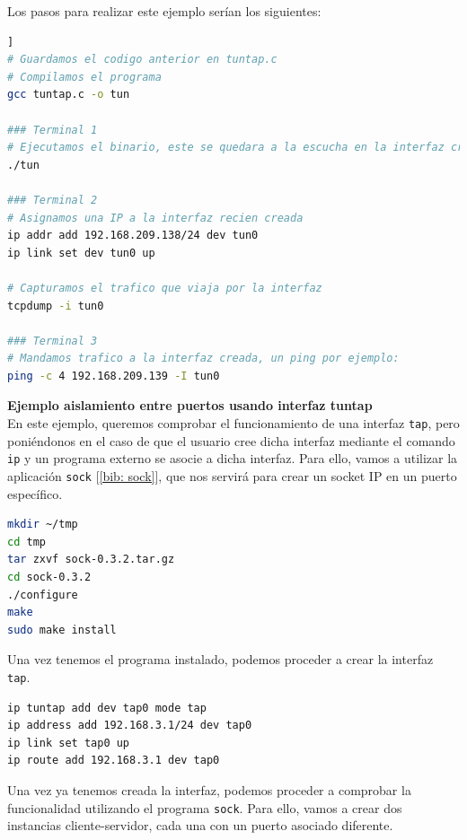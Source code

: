 \documentclass[12pt]{article}
\begin{document}
	\noindent Los pasos para realizar este ejemplo serían los siguientes:
	\begin{lstlisting}[language=Bash, label=lst: instr tuntap.c , caption=Instrucciones para realizar las pruebas con el código [\ref{lst:tuntap.c}]]
# Guardamos el codigo anterior en tuntap.c
# Compilamos el programa
gcc tuntap.c -o tun

### Terminal 1
# Ejecutamos el binario, este se quedara a la escucha en la interfaz creada
./tun

### Terminal 2
# Asignamos una IP a la interfaz recien creada
ip addr add 192.168.209.138/24 dev tun0
ip link set dev tun0 up

# Capturamos el trafico que viaja por la interfaz
tcpdump -i tun0

### Terminal 3
# Mandamos trafico a la interfaz creada, un ping por ejemplo:
ping -c 4 192.168.209.139 -I tun0
	\end{lstlisting}
	
	\pagebreak
	
	\noindent \textbf{\large Ejemplo aislamiento entre puertos usando interfaz tuntap}\\
	
	\noindent En este ejemplo, queremos comprobar el funcionamiento de una interfaz \texttt{tap}, pero poniéndonos en el caso de que el usuario cree dicha interfaz mediante el comando \texttt{ip} y un programa externo se asocie a dicha interfaz. Para ello, vamos a utilizar la aplicación \texttt{sock} [\ref{bib: sock}], que nos servirá para crear un socket IP en un puerto específico.
	
	\begin{lstlisting}[language=Bash, caption={Compilar e instalar programa \texttt{sock} (\ref{bib: sock})}]
mkdir ~/tmp
cd tmp
tar zxvf sock-0.3.2.tar.gz
cd sock-0.3.2
./configure
make
sudo make install
	\end{lstlisting}

	\noindent Una vez tenemos el programa instalado, podemos proceder a crear la interfaz \texttt{tap}.
	
	\begin{lstlisting}[language=Bash, caption={Creación interfaz TAP}]
ip tuntap add dev tap0 mode tap
ip address add 192.168.3.1/24 dev tap0
ip link set tap0 up
ip route add 192.168.3.1 dev tap0
	\end{lstlisting}

	
	\noindent Una vez ya tenemos creada la interfaz, podemos proceder a comprobar la funcionalidad utilizando el programa \texttt{sock}. Para ello, vamos a crear dos instancias cliente-servidor, cada una con un puerto asociado diferente.
	
\end{document}
